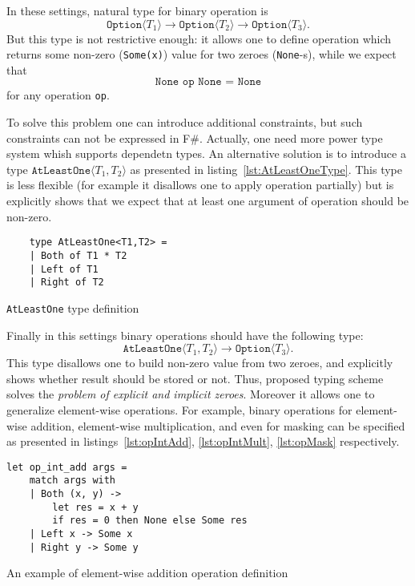 In these settings, natural type for binary operation is $$\texttt{Option}\langle T_1 \rangle \to \texttt{Option}\langle T_2 \rangle \to \texttt{Option}\langle T_3 \rangle.$$ But this type is not restrictive enough: it allows one to define operation which returns some non-zero (\texttt{Some(x)}) value for two zeroes (\texttt{None}-s), while we expect that $$\texttt{None op None = None}$$ for any operation \texttt{op}.   

To solve this problem one can introduce additional constraints, but such constraints can not be expressed in F\#.
Actually, one need more power type system whish supports dependetn types.
An alternative solution is to introduce a type $\texttt{AtLeastOne} \langle T_1, T_2 \rangle$ as presented in listing~\ref{lst:AtLeastOneType}. This type is less flexible (for example it disallows one to apply operation partially) but is explicitly shows that we expect that at least one argument of operation should be non-zero. 

\begin{listing}[h]
    \begin{verbatim}
    type AtLeastOne<T1,T2> =
    | Both of T1 * T2
    | Left of T1
    | Right of T2
    \end{verbatim}
    \caption{\texttt{AtLeastOne} type definition}
    \label{lst:AtLeastOneType}
\end{listing}

Finally in this settings binary operations should have the following type: $$\texttt{AtLeastOne} \langle T_1, T_2 \rangle \to \texttt{Option}\langle T_3 \rangle.$$
This type disallows one to build non-zero value from two zeroes, and explicitly shows whether result should be stored or not.
Thus, proposed typing scheme solves the \textit{problem of explicit and implicit zeroes}.
Moreover it allows one to generalize element-wise operations.
For example, binary operations for element-wise addition, element-wise multiplication, and even for masking can be specified as presented in listings~\ref{lst:opIntAdd}, \ref{lst:opIntMult}, \ref{lst:opMask} respectively.

\begin{listing}[h]
    \begin{verbatim}
let op_int_add args =
    match args with
    | Both (x, y) -> 
        let res = x + y 
        if res = 0 then None else Some res 
    | Left x -> Some x
    | Right y -> Some y
    \end{verbatim}
    \caption{An example of element-wise addition operation definition}
    \label{lst:opIntAdd}
\end{listing}

